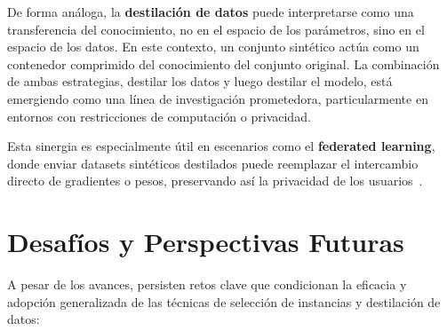 De forma análoga, la \textbf{destilación de datos} puede interpretarse como una transferencia del conocimiento,
no en el espacio de los parámetros, sino en el espacio de los datos.
En este contexto, un conjunto sintético actúa como un contenedor comprimido del conocimiento del conjunto original.
La combinación de ambas estrategias, destilar los datos y luego destilar el modelo,
está emergiendo como una línea de investigación prometedora, particularmente en entornos con restricciones de computación o privacidad.

Esta sinergia es especialmente útil en escenarios como el \textbf{federated learning},
donde enviar datasets sintéticos destilados puede reemplazar el intercambio directo de gradientes o pesos,
preservando así la privacidad de los usuarios~\cite{zhouDistilledOneShotFederated2021, arazziSecureFederatedData2025}.

\section{Desafíos y Perspectivas Futuras}
A pesar de los avances, persisten retos clave que condicionan la eficacia y adopción generalizada de las técnicas de selección de instancias y destilación de datos:

